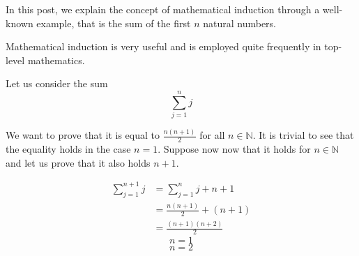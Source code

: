\documentclass[a4paper, 12pt]{article}
\theoremstyle{definition}
\theoremstyle{plain}
\theoremstyle{remark}
\begin{document}
In this post, we explain the concept of mathematical induction through a well-known example, that is the sum of the first \( n \) natural numbers.

Mathematical induction is very useful and is employed quite frequently in top-level mathematics.

Let us consider the sum
\begin{equation}
    \sum_{j = 1}^n j
\end{equation}

We want to prove that it is equal to \( \frac{n(n+1)}{2} \) for all \( n \in \mathbb{N} \). It is trivial to see that the equality holds in the case \( n = 1 \). Suppose now now that it holds for \( n \in \mathbb{N} \) and let us prove that it also holds \( n + 1 \).

\begin{align*}
    \sum_{j = 1}^{n+1} j &= \sum_{j = 1}^n j + n+1 \\
    &= \frac{n(n+1)}{2} + (n+1)\\
    &= \frac{(n+1)(n+2)}{2}
\end{align*}
\begin{equation}
    n = 1
\end{equation}
\begin{equation}
    n = 2
\end{equation}
\end{document}

